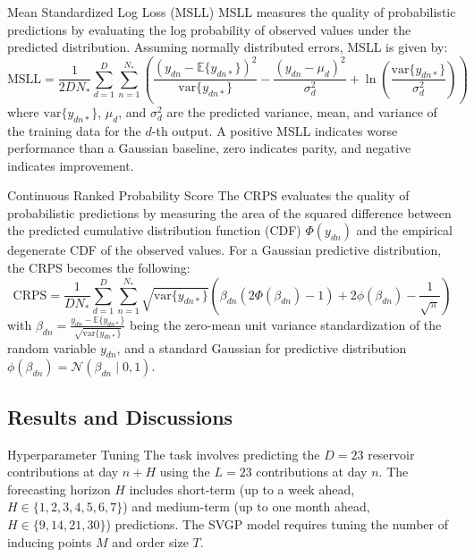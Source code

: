 \begin{frame}{Mean Standardized Log Loss (MSLL)}
	MSLL measures the quality of probabilistic predictions by evaluating the log probability of observed values under the predicted distribution. Assuming normally distributed errors, MSLL is given by:
	\begin{equation}
	\text{MSLL} = \frac{1}{2DN_{*}} \sum_{d=1}^{D} \sum_{n=1}^{N_*} \left( \frac{(y_{dn} - \mathbb{E}\{y_{dn*}\})^2}{\text{var}\{y_{dn*}\}} - \frac{(y_{dn} - \mu_d)^2}{\sigma_d^2} + \ln \left(\frac{\text{var}\{y_{dn*}\}}{\sigma_d^2}\right) \right)
	\end{equation}
	where $\text{var}\{y_{dn*}\}$, $\mu_d$, and $\sigma_d^2$ are the predicted variance, mean, and variance of the training data for the $d$-th output. A positive MSLL indicates worse performance than a Gaussian baseline, zero indicates parity, and negative indicates improvement.
\end{frame}


\begin{frame}{Continuous Ranked Probability Score}
	The CRPS evaluates the quality of probabilistic predictions by measuring the area of the squared difference between the predicted cumulative distribution function (CDF) $\Phi(y_{dn})$ and the empirical degenerate CDF of the observed values. For a Gaussian predictive distribution, the CRPS becomes the following:
	\begin{equation}
	\text{CRPS} = \frac{1}{DN_*} \sum_{d=1}^{D} \sum_{n=1}^{N_*} \sqrt{\text{var}\{y_{dn*}\}} \left(\beta_{dn} \left( 2\Phi\left(\beta_{dn}\right) - 1 \right) + 2\phi\left(\beta_{dn}\right) - \frac{1}{\sqrt{\pi}} \right)
	\end{equation}
	with $\beta_{dn} = \frac{y_{dn} - \mathbb{E}\{y_{dn*}\}}{\sqrt{\text{var}\{y_{dn*}\}}}$ being the zero-mean unit variance standardization of the random variable $y_{dn}$, and a standard Gaussian for predictive distribution $\phi(\beta_{dn})=\mathcal{N}(\beta_{dn}\mid 0,1)$.
\end{frame}

\subsection{Results and Discussions}

\begin{frame}{Hyperparameter Tuning}
	The task involves predicting the $D=23$ reservoir contributions at day $n+H$ using the $L=23$ contributions at day $n$. The forecasting horizon $H$ includes short-term (up to a week ahead, $H\in\{1,2,3,4,5,6,7\}$) and medium-term (up to one month ahead, $H\in\{9,14,21,30\}$) predictions. The SVGP model requires tuning the number of inducing points $M$ and order size $T$. 
\end{frame}

